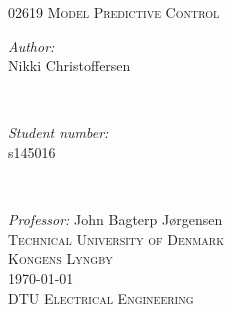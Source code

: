 \documentclass[12pt,a4paper]{article}
\theoremstyle{definition}
\begin{document}
\begin{titlepage}
\textsc{02619 Model Predictive Control}\\[0.1cm]
\vspace{7cm}

\begin{minipage}{0.5\textwidth}
\begin{flushleft} \large
\emph{Author:}\\
Nikki Christoffersen \\


\end{flushleft}
\end{minipage}
~
\begin{minipage}{0.4\textwidth}
\begin{flushright} \large
\emph{Student number:} \\
s145016\\
\end{flushright}
\end{minipage}\\[0.5cm]

\vspace{2cm}

\emph{Professor:} 
John Bagterp Jørgensen \\[1cm]

\textsc{Technical University of Denmark}\\
\textsc{Kongens Lyngby}\\[0.1cm]
{\large \today}\\[0.1cm] %
\textsc{DTU Electrical Engineering}\\[0.1cm]


\vfill %
\end{titlepage}

\begin{titlepage}
\pagestyle{empty}
\tableofcontents
\clearpage
\pagestyle{plain}
\end{titlepage}


\newpage















\newpage


\end{document}

